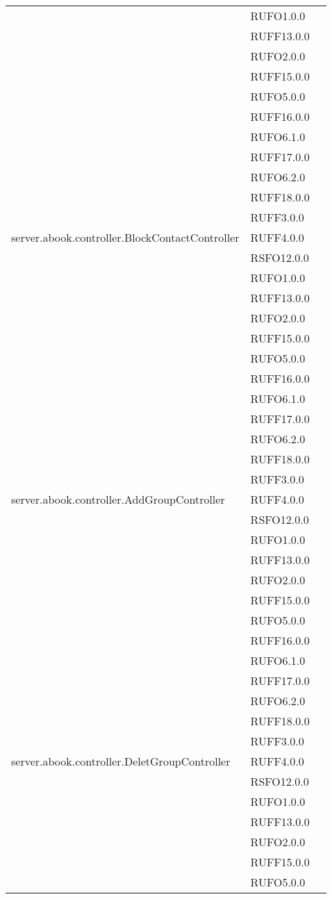 \begin{center}
\begin{longtable}{lp{}l}
 & RUFO1.0.0 \\
 & RUFF13.0.0 \\
 & RUFO2.0.0 \\
 & RUFF15.0.0 \\
 & RUFO5.0.0 \\
 & RUFF16.0.0 \\
 & RUFO6.1.0 \\
 & RUFF17.0.0 \\
 & RUFO6.2.0 \\
 & RUFF18.0.0 \\
 & RUFF3.0.0 \\
server.abook.controller.BlockContactController & RUFF4.0.0 \\
 & RSFO12.0.0 \\
 & RUFO1.0.0 \\
 & RUFF13.0.0 \\
 & RUFO2.0.0 \\
 & RUFF15.0.0 \\
 & RUFO5.0.0 \\
 & RUFF16.0.0 \\
 & RUFO6.1.0 \\
 & RUFF17.0.0 \\
 & RUFO6.2.0 \\
 & RUFF18.0.0 \\
 & RUFF3.0.0 \\
server.abook.controller.AddGroupController & RUFF4.0.0 \\
 & RSFO12.0.0 \\
 & RUFO1.0.0 \\
 & RUFF13.0.0 \\
 & RUFO2.0.0 \\
 & RUFF15.0.0 \\
 & RUFO5.0.0 \\
 & RUFF16.0.0 \\
 & RUFO6.1.0 \\
 & RUFF17.0.0 \\
 & RUFO6.2.0 \\
 & RUFF18.0.0 \\
 & RUFF3.0.0 \\
server.abook.controller.DeletGroupController & RUFF4.0.0 \\
 & RSFO12.0.0 \\
 & RUFO1.0.0 \\
 & RUFF13.0.0 \\
 & RUFO2.0.0 \\
 & RUFF15.0.0 \\
 & RUFO5.0.0 \\

\end{longtable}
\end{center}
